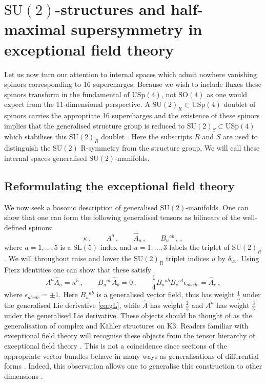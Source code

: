 \documentclass{PoS}
\newcommand{\SU}[1]{\mathrm{SU}( #1 )}
\newcommand{\SL}[1]{\mathrm{SL}( #1 )}
\newcommand{\SO}[1]{\mathrm{SO}( #1 )}
\newcommand{\USp}[1]{\mathrm{USp}(#1)}
\begin{document}
\section{$\SU{2}$-structures and half-maximal supersymmetry in exceptional field theory} \label{s:SU2}
Let us now turn our attention to internal spaces which admit nowhere vanishing spinors corresponding to 16 supercharges. Because we wish to include fluxes these spinors transform in the fundamental of $\USp{4}$, not $\SO{4}$ as one would expect from the 11-dimensional perspective. A $\SU{2}_R \subset \USp{4}$ doublet of spinors carries the appropriate 16 supercharges and the existence of these spinors implies that the generalised structure group is reduced to $\SU{2}_S \subset \USp{4}$ which stabilises this $\SU{2}_R$ doublet \cite{Coimbra:2014uxa}. Here the subscripts $R$ and $S$ are used to distinguish the $\SU{2}$ R-symmetry from the structure group. We will call these internal spaces generalised $\SU{2}$-manifolds.

\subsection{Reformulating the exceptional field theory}
We now seek a bosonic description of generalised $\SU{2}$-manifolds. One can show \cite{Malek:2016bpu} that one can form the following generalised tensors as bilinears of the well-defined spinors:
\begin{equation}
 \kappa\,, \qquad A^a\,, \qquad \hat{A}_a\,, \qquad B_u{}^{ab}\,, \,,
\end{equation}
where $a = 1, \ldots, 5$ is a $\SL{5}$ index and $u = 1, \ldots, 3$ labels the triplet of $\SU{2}_R$. We will throughout raise and lower the $\SU{2}_R$ triplet indices $u$ by $\delta_{uv}$. Using Fierz identities one can show that these satisfy
\begin{equation}
 A^a \hat{A}_a = \kappa^5 \,, \qquad B_u{}^{ab} \hat{A}_b = 0 \,, \qquad \frac14 B_{u}{}^{ab} B_{v}{}^{cd} \epsilon_{abcde} = \hat{A}_e \,, \label{eq:Compatibility}
\end{equation}
where $\epsilon_{abcde} = \pm 1$. Here $B_u{}^{ab}$ is a generalised vector field, thus has weight $\frac15$ under the generalised Lie derivative \eqref{eq:gL}, while $\hat{A}$ has weight $\frac25$ and $A^a$ has weight $\frac35$ under the generalised Lie derivative. These objects should be thought of as the generalisation of complex and K\"ahler structures on K3. Readers familiar with exceptional field theory will recognise these objects from the tensor hierarchy of exceptional field theory \cite{Hohm:2015xna,Wang:2015hca}. This is not a coincidence since sections of the appropriate vector bundles behave in many ways as generalisations of differential forms \cite{Cederwall:2013naa}. Indeed, this observation allows one to generalise this construction to other dimensions \cite{Malek:2017njj}.
\end{document}
